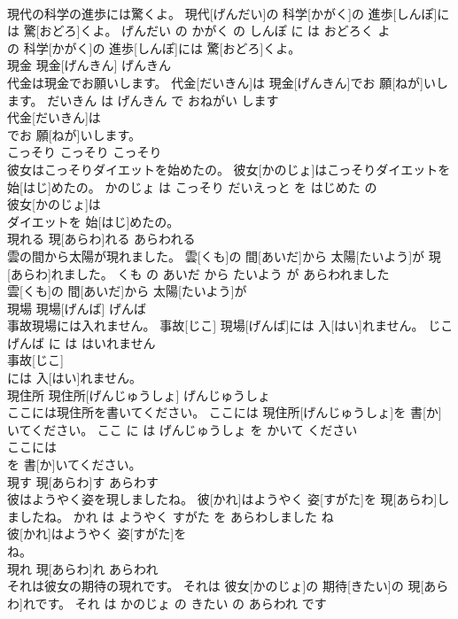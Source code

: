 \documentclass[8pt]{extreport}
\begin{document}
\begin{CJK}{UTF8}{min}
\\	現代の科学の進歩には驚くよ。	現代[げんだい]の 科学[かがく]の 進歩[しんぽ]には 驚[おどろ]くよ。	げんだい の かがく の しんぽ に は おどろく よ	
\\	の 科学[かがく]の 進歩[しんぽ]には 驚[おどろ]くよ。			
\\	現金	現金[げんきん]	げんきん	
\\	代金は現金でお願いします。	代金[だいきん]は 現金[げんきん]でお 願[ねが]いします。	だいきん は げんきん で おねがい します	
\\	代金[だいきん]は
\\	でお 願[ねが]いします。			
\\	こっそり	こっそり	こっそり	
\\	彼女はこっそりダイエットを始めたの。	彼女[かのじょ]はこっそりダイエットを 始[はじ]めたの。	かのじょ は こっそり だいえっと を はじめた の	
\\	彼女[かのじょ]は
\\	ダイエットを 始[はじ]めたの。			
\\	現れる	現[あらわ]れる	あらわれる	
\\	雲の間から太陽が現れました。	雲[くも]の 間[あいだ]から 太陽[たいよう]が 現[あらわ]れました。	くも の あいだ から たいよう が あらわれました	
\\	雲[くも]の 間[あいだ]から 太陽[たいよう]が
\\	現場	現場[げんば]	げんば	
\\	事故現場には入れません。	事故[じこ] 現場[げんば]には 入[はい]れません。	じこ げんば に は はいれません	
\\	事故[じこ]
\\	には 入[はい]れません。			
\\	現住所	現住所[げんじゅうしょ]	げんじゅうしょ	
\\	ここには現住所を書いてください。	ここには 現住所[げんじゅうしょ]を 書[か]いてください。	ここ に は げんじゅうしょ を かいて ください	
\\	ここには
\\	を 書[か]いてください。			
\\	現す	現[あらわ]す	あらわす	
\\	彼はようやく姿を現しましたね。	彼[かれ]はようやく 姿[すがた]を 現[あらわ]しましたね。	かれ は ようやく すがた を あらわしました ね	
\\	彼[かれ]はようやく 姿[すがた]を
\\	ね。			
\\	現れ	現[あらわ]れ	あらわれ	
\\	それは彼女の期待の現れです。	それは 彼女[かのじょ]の 期待[きたい]の 現[あらわ]れです。	それ は かのじょ の きたい の あらわれ です	

\end{CJK}
\end{document}
